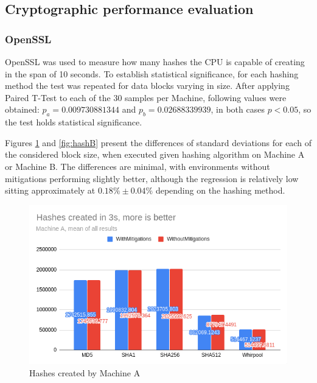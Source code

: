 \documentclass{csfourzero}
\begin{document}
\subsection{Cryptographic performance evaluation}

\subsubsection{OpenSSL}

OpenSSL was used to measure how many hashes the CPU is capable of creating in the span of 10 seconds. To establish statistical significance, for each hashing method the test was repeated for data blocks varying in size. After applying Paired T-Test to each of the 30 samples per Machine, following values were obtained: $p_{a} = 0.009730881344$ and $p_{b} = 0.02688339939$, in both cases $p < 0.05$, so the test holds statistical significance.

Figures \ref{fig:hashA} and \ref{fig:hashB} present the differences of standard deviations for each of the considered block size, when executed given hashing algorithm on Machine A or Machine B. The differences are minimal, with environments without mitigations performing slightly better, although the regression is relatively low sitting approximately at $0.18\% \pm 0.04\%$ depending on the hashing method. 

\begin{figure}[!h]
\centering
\includegraphics[width=13cm]{hashA}
\caption{Hashes created by Machine A}
\label{fig:hashA}
\end{figure}
\end{document}

